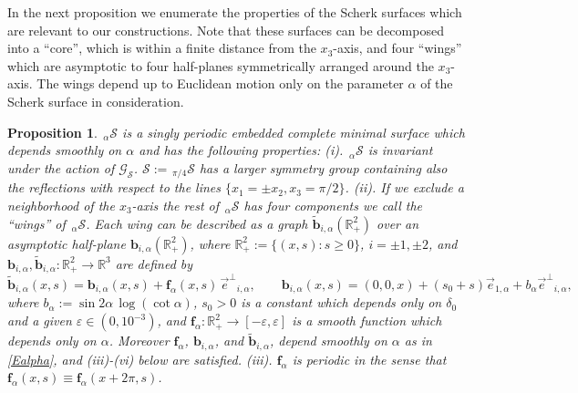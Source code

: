\documentclass[12pt,namelimits,sumlimits]{amsart}
\newtheorem{prop}[theorem]{Proposition}
\theoremstyle{remark}
\numberwithin{equation}{section}
\begin{document}
In the next proposition we enumerate the properties of the
Scherk surfaces which are relevant to our constructions.
Note that these surfaces can be decomposed into a ``core'',
which is within a finite distance from the $x_3$-axis,
and four ``wings''
which are asymptotic to four half-planes
symmetrically arranged around the $x_3$-axis.
The wings depend up to Euclidean motion only on the parameter $\alpha$
of the Scherk surface in consideration.
  
\addtocounter{equation}{1}
\begin{prop}
\label{PScherk}
${{{}_{\,\alpha\!}\mathcal{S}}}$ is a singly periodic
embedded complete minimal surface which
depends smoothly on $\alpha$ and has the following properties:
\newline
(i). ${{{}_{\,\alpha\!}\mathcal{S}}}$ is invariant under the action of ${{\mathscr{G}_{{\mathcal{S}}}}}$.
${{\mathcal{S}}}:={{{}_{\,\pi/4\!}\mathcal{S}}}$ 
has a larger symmetry group containing 
also the reflections with respect to the lines
$\{x_1=\pm x_2,x_3=\pi/2\}$.
\newline
(ii).
If we exclude a neighborhood of the $x_3$-axis the rest of ${{{}_{\,\alpha\!}\mathcal{S}}}$
has four components we call the ``wings'' of ${{{}_{\,\alpha\!}\mathcal{S}}}$.
Each wing can be described as a graph ${\widetilde{\boldsymbol{b}}}_{{i,\alpha}}({{{\mathbb{R}}^2_+}})$
over an asymptotic half-plane ${\boldsymbol{b}}_{{i,\alpha}}({{{\mathbb{R}}^2_+}})$,
where ${{{\mathbb{R}}^2_+}}:=\{(x,s):s\ge0\}$, 
${{i=\pm1,\pm2}}$,
and
${\boldsymbol{b}}_{{i,\alpha}},{\widetilde{\boldsymbol{b}}}_{{i,\alpha}}:{{{\mathbb{R}}^2_+}}\to{{{\mathbb{R}}^3}}$
are defined by
$$
{\widetilde{\boldsymbol{b}}}_{{i,\alpha}}(x,s)={\boldsymbol{b}}_{{i,\alpha}}(x,s)+{\boldsymbol{f}_\alpha}(x,s)\,{{\vec{e}^\perp}}_{i,\alpha},
\qquad
{\boldsymbol{b}}_{i,\alpha}(x,s)=(0,0,x)+(s_0+s){\vec{e}}_{1,\alpha}+b_\alpha {{\vec{e}^\perp}}_{i,\alpha},
$$
where 
$b_\alpha:=\sin2\alpha\,\log(\cot\alpha)$,
$s_0>0$ is a constant which depends only on $\delta_0$ and a given 
$\varepsilon\in(0,10^{-3})$,
and ${\boldsymbol{f}_\alpha}:{\mathbb{R}}^2_+\to[-\varepsilon,\varepsilon]$
is a smooth function
which depends only on $\alpha$.
Moreover
${\boldsymbol{f}_\alpha}$, ${\boldsymbol{b}}_{i,\alpha}$, and ${\widetilde{\boldsymbol{b}}}_{{i,\alpha}}$,
depend smoothly on
$\alpha$ as in \ref{Ealpha},
and (iii)-(vi) below are satisfied.
\newline
(iii).
${\boldsymbol{f}_\alpha}$ is periodic in the sense that ${\boldsymbol{f}_\alpha}(x,s)\equiv{\boldsymbol{f}_\alpha}(x+2\pi,s)$.

\end{prop}
\end{document}
